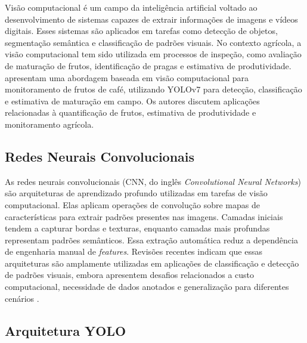 \documentclass[artigo,times,capa]{iftex2024}
\begin{document}
Visão computacional é um campo da inteligência artificial voltado ao desenvolvimento de sistemas capazes de extrair informações de imagens e vídeos digitais. Esses sistemas são aplicados em tarefas como detecção de objetos, segmentação semântica e classificação de padrões visuais. No contexto agrícola, a visão computacional tem sido utilizada em processos de inspeção, como avaliação de maturação de frutos, identificação de pragas e estimativa de produtividade. \textcite{Eron2024Computer} apresentam uma abordagem baseada em visão computacional para monitoramento de frutos de café, utilizando YOLOv7 para detecção, classificação e estimativa de maturação em campo. Os autores discutem aplicações relacionadas à quantificação de frutos, estimativa de produtividade e monitoramento agrícola.
 
\subsection{Redes Neurais Convolucionais}
 
As redes neurais convolucionais (CNN, do inglês \textit{Convolutional Neural Networks}) são arquiteturas de aprendizado profundo utilizadas em tarefas de visão computacional. Elas aplicam operações de convolução sobre mapas de características para extrair padrões presentes nas imagens. Camadas iniciais tendem a capturar bordas e texturas, enquanto camadas mais profundas representam padrões semânticos. Essa extração automática reduz a dependência de engenharia manual de \textit{features}. Revisões recentes indicam que essas arquiteturas são amplamente utilizadas em aplicações de classificação e detecção de padrões visuais, embora apresentem desafios relacionados a custo computacional, necessidade de dados anotados e generalização para diferentes cenários \cite{Alzubaidi2021Review}.
 
\subsection{Arquitetura YOLO}
 
\end{document}
